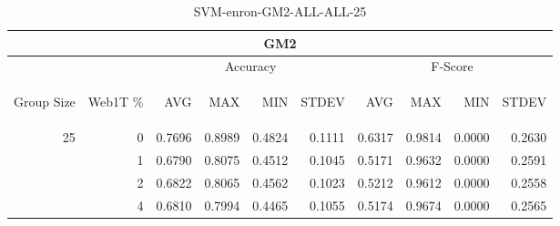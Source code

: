 \begin{center}
\begin{table}[htbp] 
 \begin{center}
\begin{tabular}{ | r | r | r | r | r | r | r | r | r | r |}
\hline
\multicolumn{10}{|c|}{GM2}\\
\hline
 & & \multicolumn{4}{|c|}{Accuracy} & \multicolumn{4}{|c|}{F-Score}\\ \cline{3-10}
\begin{sideways}Group Size\end{sideways} & \begin{sideways}Web1T \%\end{sideways} & \begin{sideways}AVG\end{sideways} & \begin{sideways}MAX\end{sideways} & \begin{sideways}MIN\end{sideways} & \begin{sideways}STDEV\end{sideways} & \begin{sideways}AVG\end{sideways} & \begin{sideways}MAX\end{sideways} & \begin{sideways}MIN\end{sideways} & \begin{sideways}STDEV\end{sideways}\\
\hline
\multirow{3}{*}{25}
 & 0 & 0.7696 & 0.8989 & 0.4824 & 0.1111 & 0.6317 & 0.9814 & 0.0000 & 0.2630\\ \cline{2-10}
 & 1 & 0.6790 & 0.8075 & 0.4512 & 0.1045 & 0.5171 & 0.9632 & 0.0000 & 0.2591\\ \cline{2-10}
 & 2 & 0.6822 & 0.8065 & 0.4562 & 0.1023 & 0.5212 & 0.9612 & 0.0000 & 0.2558\\ \cline{2-10}
 & 4 & 0.6810 & 0.7994 & 0.4465 & 0.1055 & 0.5174 & 0.9674 & 0.0000 & 0.2565\\ \cline{2-10}
\hline
\end{tabular}
\caption{SVM-enron-GM2-ALL-ALL-25}
\label{table:SVM-enron-GM2-ALL-ALL-25}
\end{center}
 \end{table}
\end{center}


